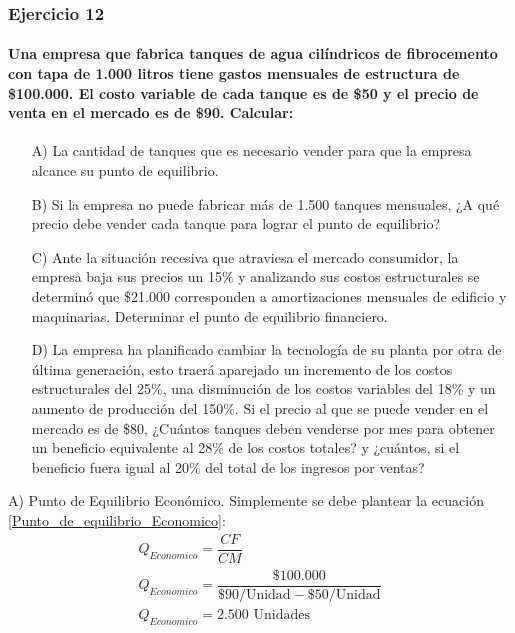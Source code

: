 \documentclass[12pt,a4paper]{article}
\newcommand{\consigna}[1]{\paragraph{\indent #1} \hspace{0pt}}
\begin{document}
        \hrulefill
        
    
    	\subsubsection{Ejercicio 12}
        
        
        \consigna{Una empresa que fabrica tanques de agua cilíndricos de fibrocemento con tapa de 1.000 litros tiene gastos mensuales de estructura de \$100.000. El costo variable de cada tanque es de \$50 y el precio de venta en el mercado es de \$90. Calcular:}
        \begin{itemize}
			\item[A)]	La cantidad de tanques que es necesario vender para que la empresa alcance su punto de equilibrio.
            \item[B)]	Si la empresa no puede fabricar más de 1.500 tanques mensuales, ¿A qué precio debe vender cada tanque para lograr el punto de equilibrio?
            \item[C)]	Ante la situación recesiva que atraviesa el mercado consumidor, la empresa baja sus precios un 15\% y analizando sus costos estructurales se determinó que \$21.000 corresponden a amortizaciones mensuales de edificio y maquinarias. Determinar el punto de equilibrio financiero.
            \item[D)]	La empresa ha planificado cambiar la tecnología de su planta por otra de última generación, esto traerá aparejado un incremento de los costos estructurales del 25\%, una disminución de los costos variables del 18\% y un aumento de producción del 150\%. Si el precio al que se puede vender en el mercado es de \$80, ¿Cuántos tanques deben venderse por mes para obtener un beneficio equivalente al 28\% de los costos totales? y ¿cuántos, si el beneficio fuera igual al 20\% del total de los ingresos por ventas?
		\end{itemize}
        
        A) Punto de Equilibrio Económico. Simplemente se debe plantear la ecuación \ref{Punto_de_equilibrio_Economico}:
        \begin{gather*}
            Q_{Economico} = \dfrac{ CF }{ CM } \\
            Q_{Economico} = \dfrac{ \$100{.}000 }{ \$90 / \text{Unidad} - \$50 / \text{Unidad} } \\
            Q_{Economico} = 2{.}500\text{ Unidades}
        \end{gather*}
        
\end{document}
